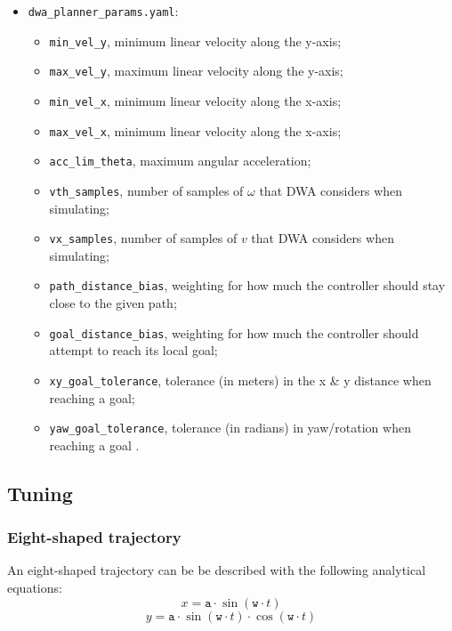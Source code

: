 \documentclass[11pt,a4paper]{article}
\begin{document}
\begin{itemize}
    \item \texttt{dwa\_planner\_params.yaml}:
        \begin{itemize}
            \item \texttt{min\_vel\_y}, minimum linear velocity along the y-axis;
            \item \texttt{max\_vel\_y}, maximum linear velocity along the y-axis;
            \item \texttt{min\_vel\_x}, minimum linear velocity along the x-axis;
            \item \texttt{max\_vel\_x}, minimum linear velocity along the x-axis;
            \item \texttt{acc\_lim\_theta}, maximum angular acceleration;
            \item \texttt{vth\_samples}, number of samples of $\omega$ that DWA considers when simulating;
            \item \texttt{vx\_samples}, number of samples of $v$ that DWA considers when simulating;
            \item \texttt{path\_distance\_bias}, weighting for how much the controller should stay close to the given path;
            \item \texttt{goal\_distance\_bias}, weighting for how much the controller should attempt to reach its local goal;
            \item \texttt{xy\_goal\_tolerance}, tolerance (in meters) in the x \& y distance when reaching a goal;
            \item \texttt{yaw\_goal\_tolerance}, tolerance (in radians) in yaw/rotation when reaching a goal .\\
        \end{itemize}

\end{itemize}


\subsection{Tuning}

\subsubsection{Eight-shaped trajectory}

An eight-shaped trajectory can be be described with the following analytical equations:
$$x = \texttt{a} \cdot \sin (\texttt{w} \cdot t)$$
$$y = \texttt{a} \cdot \sin (\texttt{w} \cdot t)\cdot \cos (\texttt{w} \cdot t)$$\\
\end{document}
